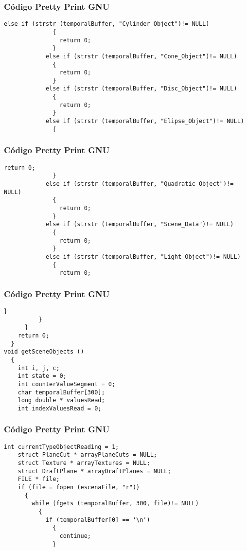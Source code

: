 \documentclass{beamer}
\begin{document}
\begin{frame}[fragile]
\frametitle{C\'odigo Pretty Print GNU}
\begin{lstlisting}[style=CStyle]
            else if (strstr (temporalBuffer, "Cylinder_Object")!= NULL)
              {
                return 0;
              }
            else if (strstr (temporalBuffer, "Cone_Object")!= NULL)
              {
                return 0;
              }
            else if (strstr (temporalBuffer, "Disc_Object")!= NULL)
              {
                return 0;
              }
            else if (strstr (temporalBuffer, "Elipse_Object")!= NULL)
              {
                \end{lstlisting}
\end{frame}
\begin{frame}[fragile]
\frametitle{C\'odigo Pretty Print GNU}
\begin{lstlisting}[style=CStyle]
                return 0;
              }
            else if (strstr (temporalBuffer, "Quadratic_Object")!= NULL)
              {
                return 0;
              }
            else if (strstr (temporalBuffer, "Scene_Data")!= NULL)
              {
                return 0;
              }
            else if (strstr (temporalBuffer, "Light_Object")!= NULL)
              {
                return 0;
\end{lstlisting}
\end{frame}
\begin{frame}[fragile]
\frametitle{C\'odigo Pretty Print GNU}
\begin{lstlisting}[style=CStyle]
              }
          }
      }
    return 0;
  }
void getSceneObjects ()
  {
    int i, j, c;
    int state = 0;
    int counterValueSegment = 0;
    char temporalBuffer[300];
    long double * valuesRead;
    int indexValuesRead = 0;
\end{lstlisting}
\end{frame}
\begin{frame}[fragile]
\frametitle{C\'odigo Pretty Print GNU}
\begin{lstlisting}[style=CStyle]
    int currentTypeObjectReading = 1;
    struct PlaneCut * arrayPlaneCuts = NULL;
    struct Texture * arrayTextures = NULL;
    struct DraftPlane * arrayDraftPlanes = NULL;
    FILE * file;
    if (file = fopen (escenaFile, "r"))
      {
        while (fgets (temporalBuffer, 300, file)!= NULL)
          {
            if (temporalBuffer[0] == '\n')
              {
                continue;
              }
\end{lstlisting}
\end{frame}
\end{document}
